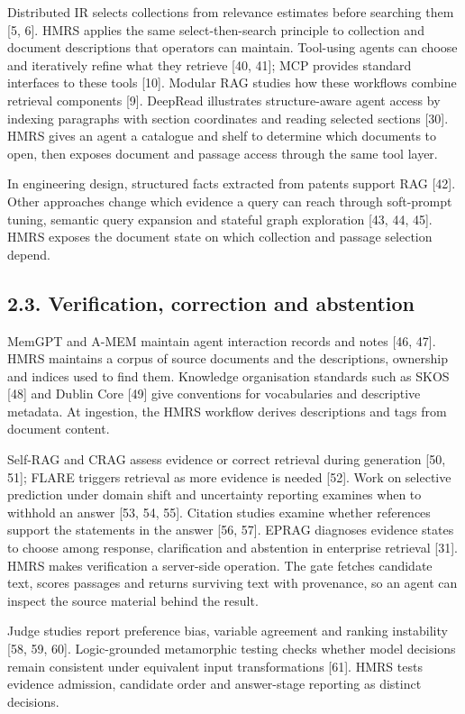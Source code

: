 Distributed IR selects collections from relevance estimates before searching
them [5, 6]. HMRS applies the same
select-then-search principle to collection and document descriptions that
operators can maintain. Tool-using agents can choose and iteratively refine
what they retrieve [40, 41]; MCP provides standard
interfaces to these tools [10]. Modular RAG studies how these
workflows combine retrieval components [9]. DeepRead
illustrates structure-aware agent access by indexing paragraphs with section
coordinates and reading selected sections [30]. HMRS gives
an agent a catalogue and shelf to determine which documents to open, then
exposes document and passage access through the same tool layer.

In engineering design, structured facts extracted from patents support RAG
[42]. Other approaches change which evidence a
query can reach through soft-prompt tuning, semantic query expansion and
stateful graph exploration
[43, 44, 45]. HMRS exposes the document
state on which collection and passage selection depend.

\subsection{2.3. Verification, correction and abstention}

MemGPT and A-MEM maintain agent interaction records and notes
[46, 47]. HMRS maintains a corpus of source
documents and the descriptions, ownership and indices used to find them.
Knowledge organisation standards such as SKOS [48] and Dublin Core
[49]
give conventions for vocabularies and descriptive metadata. At ingestion,
the HMRS workflow derives descriptions and tags from document content.

Self-RAG and CRAG assess evidence or correct retrieval during generation
[50, 51]; FLARE triggers retrieval as more evidence is needed
[52]. Work on selective prediction under domain shift and
uncertainty reporting examines when to withhold an answer
[53, 54, 55]. Citation studies examine whether
references support the statements in the answer
[56, 57].
EPRAG diagnoses evidence states to choose among response, clarification and
abstention in enterprise retrieval [31].
HMRS makes verification a server-side operation. The gate fetches
candidate text, scores passages and returns surviving text with provenance,
so an agent can inspect the source material behind the result.

Judge studies report preference bias, variable agreement and ranking
instability [58, 59, 60].
Logic-grounded metamorphic testing checks whether model decisions remain
consistent under equivalent input transformations [61].
HMRS tests evidence admission, candidate order and answer-stage reporting
as distinct decisions.

